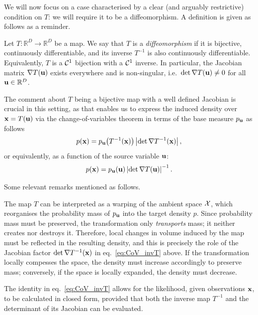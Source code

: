 We will now focus on a case characterised by a clear (and arguably restrictive) condition on $T$: we will require it to be a diffeomorphism. A definition is given as follows as a reminder.

\begin{definition}[Diffeomorphism]
Let $T:\mathbb{R}^D \to \mathbb{R}^D$ be a map. We say that $T$ is a \emph{diffeomorphism} if it is bijective, continuously differentiable, and its inverse $T^{-1}$ is also continuously differentiable. Equivalently, $T$ is a ${\mathcal C}^1$ bijection with a ${\mathcal C}^1$ inverse. In particular, the Jacobian matrix $\nabla T({ \mathbf{u}})$ exists everywhere and is non-singular, i.e.\ $\det \nabla T({ \mathbf{u}}) \neq 0$ for all ${ \mathbf{u}} \in \mathbb{R}^D$.
\end{definition}

The comment about $T$ being a bijective map with a well defined Jacobian is crucial in this setting, as that enables us to express the induced density over ${ \mathbf{x}} = T({ \mathbf{u}})$ via the change-of-variables theorem in terms of the base measure $p_{ \mathbf{u}}$ as follows 
\begin{equation}
\label{eq:CoV_invT}    
p({ \mathbf{x}})
=
p_{ \mathbf{u}}\!\left(T^{-1}({ \mathbf{x}})\right)
\left|
\det \nabla T^{-1}({ \mathbf{x}})
\right|,
\end{equation}
or equivalently, as a function of the source variable ${ \mathbf{u}}$:
\begin{equation}
\label{eq:CoV_T}    
p({ \mathbf{x}})
=
p_{ \mathbf{u}}({ \mathbf{u}})
\left|
\det \nabla T({ \mathbf{u}})
\right|^{-1}.
\end{equation}


Some relevant remarks mentioned as follows. 

\begin{remark}
The map $T$ can be interpreted as a warping of the ambient space ${\mathcal X}$, which reorganises the probability mass of $p_{ \mathbf{u}}$ into the target density $p$. Since probability mass must be preserved, the transformation only \emph{transports} mass; it neither creates nor destroys it. Therefore, local changes in volume induced by the map must be reflected in the resulting density, and this is precisely the role of the Jacobian factor $\det \nabla T^{-1}({ \mathbf{x}})$ in eq.~\eqref{eq:CoV_invT} above. If the transformation locally compesses the space, the density must increase accordingly to preserve mass; conversely, if the space is locally expanded, the density must decrease.
\end{remark}


\begin{remark}
The identity in eq.~\eqref{eq:CoV_invT} allows for the likelihood, given observations ${ \mathbf{x}}$, to be calculated in closed form, provided that both the inverse map $T^{-1}$ and the determinant of its Jacobian can be evaluated.
\end{remark}

